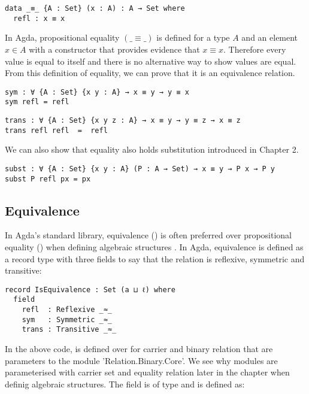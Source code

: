 \begin{verbatim}
data _≡_ {A : Set} (x : A) : A → Set where
  refl : x ≡ x
\end{verbatim}

In Agda, propositional equality $(\_ \equiv\_ )$ is defined for a type $A$ and
an element $x \in A$ with a constructor  that provides evidence
that $x \equiv x$. Therefore every value is equal to itself and there is no
alternative way to show values are equal. From this definition of equality, we
can prove that it is an equivalence relation.

\begin{verbatim}
sym : ∀ {A : Set} {x y : A} → x ≡ y → y ≡ x
sym refl = refl
\end{verbatim}

\begin{verbatim}
trans : ∀ {A : Set} {x y z : A} → x ≡ y → y ≡ z → x ≡ z
trans refl refl  =  refl
\end{verbatim}

We can also show that equality also holds substitution introduced in Chapter 2.

\begin{verbatim}
subst : ∀ {A : Set} {x y : A} (P : A → Set) → x ≡ y → P x → P y
subst P refl px = px
\end{verbatim}

\subsection{Equivalence}

In Agda's standard library, equivalence () is often preferred over
propositional equality () when defining algebraic structures
\cite{musa}. In Agda, equivalence is defined as a record type with three fields
to say that the relation is reflexive, symmetric and transitive:

\begin{verbatim}
record IsEquivalence : Set (a ⊔ ℓ) where
  field
    refl  : Reflexive _≈_
    sym   : Symmetric _≈_
    trans : Transitive _≈_
\end{verbatim}

In the above code,  is defined over for carrier  and binary relation  that are parameters to the
module 'Relation.Binary.Core'. We see why modules are parameterised with carrier
set and equality relation later in the chapter when definig algebraic
structures. The field  is of type  and is
defined as:

